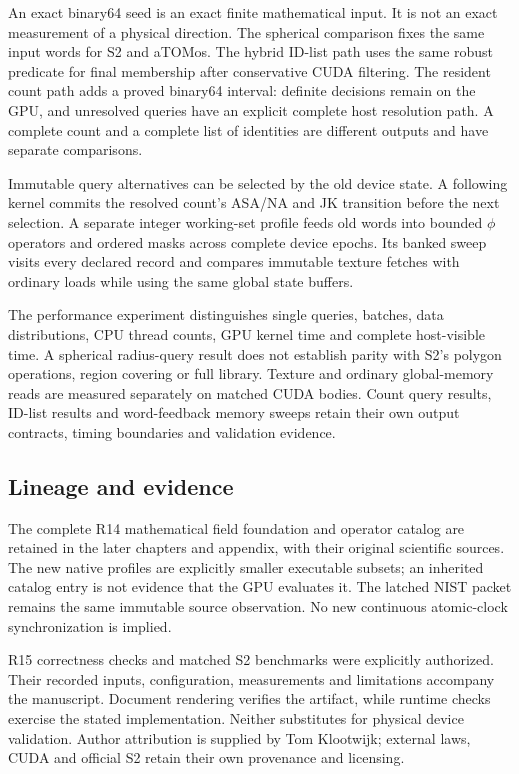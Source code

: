 An exact binary64 seed is an exact finite mathematical input. It is not an
exact measurement of a physical direction. The spherical comparison fixes
the same input words for S2 and aTOMos. The hybrid ID-list path uses the same
robust predicate for final membership after conservative CUDA filtering.
The resident count path adds a proved binary64 interval: definite decisions
remain on the GPU, and unresolved queries have an explicit complete host
resolution path. A complete count and a complete list of identities are
different outputs and have separate comparisons.

Immutable query alternatives can be selected by the old device state. A
following kernel commits the resolved count's ASA/NA and JK transition before
the next selection. A separate integer working-set profile feeds old words
into bounded $\phi$ operators and ordered masks across complete device epochs.
Its banked sweep visits every declared record and compares immutable texture
fetches with ordinary loads while using the same global state buffers.

The performance experiment distinguishes single queries, batches, data
distributions, CPU thread counts, GPU kernel time and complete host-visible
time. A spherical radius-query result does not establish parity with S2's
polygon operations, region covering or full library. Texture and ordinary
global-memory reads are measured separately on matched CUDA bodies. Count
query results, ID-list results and word-feedback memory sweeps retain their
own output contracts, timing boundaries and validation evidence.

\subsection*{Lineage and evidence}
The complete R14 mathematical field foundation and operator catalog are
retained in the later chapters and appendix, with their original scientific
sources. The new native profiles are explicitly smaller executable subsets;
an inherited catalog entry is not evidence that the GPU evaluates it.
The latched NIST packet remains the same immutable source observation.
No new continuous atomic-clock synchronization is implied.

R15 correctness checks and matched S2 benchmarks were explicitly authorized.
Their recorded inputs, configuration, measurements and limitations accompany
the manuscript. Document rendering verifies the artifact, while runtime checks
exercise the stated implementation. Neither substitutes for physical device
validation. Author attribution is supplied by Tom Klootwijk; external laws,
CUDA and official S2 retain their own provenance and licensing.
\clearpage
